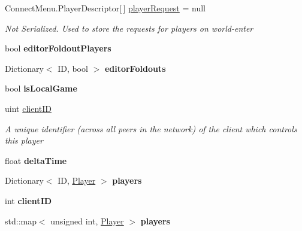 \begin{DoxyCompactItemize}
\item 
Connect\-Menu.\-Player\-Descriptor\mbox{[}$\,$\mbox{]} \hyperlink{class_game_state_a8b1949523ac8e40776c0617666023d64}{player\-Request} = null
\begin{DoxyCompactList}\small\item\em Not Serialized. Used to store the requests for players on world-\/enter \end{DoxyCompactList}\item 
\hypertarget{class_game_state_ad68ed3f1f32060bfff68d296e6750712}{bool {\bfseries editor\-Foldout\-Players}}\label{class_game_state_ad68ed3f1f32060bfff68d296e6750712}

\item 
\hypertarget{class_game_state_a47358e83d829da7a28c49f8d0a795125}{Dictionary$<$ I\-D, bool $>$ {\bfseries editor\-Foldouts}}\label{class_game_state_a47358e83d829da7a28c49f8d0a795125}

\item 
\hypertarget{class_game_state_aa4cba70bc38a13e80439dc784c6ca12e}{bool {\bfseries is\-Local\-Game}}\label{class_game_state_aa4cba70bc38a13e80439dc784c6ca12e}

\item 
uint \hyperlink{class_game_state_ad24a423ba6655fc6541b2f12ce98e0d0}{client\-I\-D}
\begin{DoxyCompactList}\small\item\em A unique identifier (across all peers in the network) of the client which controls this player \end{DoxyCompactList}\item 
\hypertarget{class_game_state_a857eed8c97274c3dd9d3eb558a33f855}{float {\bfseries delta\-Time}}\label{class_game_state_a857eed8c97274c3dd9d3eb558a33f855}

\item 
\hypertarget{class_game_state_aed9c4cf83c497c6e36585e0ed3999564}{Dictionary$<$ I\-D, \hyperlink{class_game_state_1_1_player}{Player} $>$ {\bfseries players}}\label{class_game_state_aed9c4cf83c497c6e36585e0ed3999564}

\item 
\hypertarget{class_game_state_adb8c9c7f10d683332cbd62927d35cb35}{int {\bfseries client\-I\-D}}\label{class_game_state_adb8c9c7f10d683332cbd62927d35cb35}

\item 
\hypertarget{class_game_state_a8f156a6cce5f2b9945c274b6bfc971ce}{std\-::map$<$ unsigned int, \hyperlink{class_game_state_1_1_player}{Player} $>$ {\bfseries players}}\label{class_game_state_a8f156a6cce5f2b9945c274b6bfc971ce}

\end{DoxyCompactItemize}
